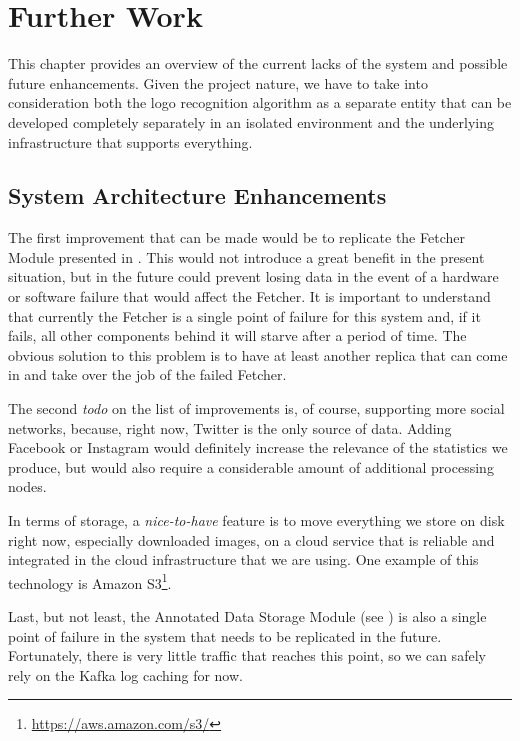 \chapter{Further Work}

This chapter provides an overview of the current lacks of the system and
possible future enhancements. Given the project nature, we have to take into
consideration both the logo recognition algorithm as a separate entity that
can be developed completely separately in an isolated environment and the
underlying infrastructure that supports everything.

\section{System Architecture Enhancements}

The first improvement that can be made would be to replicate the Fetcher
Module presented in . This would
not introduce a great benefit in the present situation, but in the future
could prevent losing data in the event of a hardware or software failure that
would affect the Fetcher. It is important to understand that currently the
Fetcher is a single point of failure for this system and, if it fails, all
other components behind it will starve after a period of time. The obvious
solution to this problem is to have at least another replica that can come in and
take over the job of the failed Fetcher.

The second \textit{todo} on the list of improvements is, of course, supporting
more social networks, because, right now, Twitter is the only source of data.
Adding Facebook or Instagram would definitely increase the relevance of the
statistics we produce, but would also require a considerable amount of
additional processing nodes.

In terms of storage, a \textit{nice-to-have} feature is to move everything we
store on disk right now, especially downloaded images, on a cloud service that
is reliable and integrated in the cloud infrastructure that we are using. One
example of this technology is Amazon
S3\footnote{\url{https://aws.amazon.com/s3/}}.

Last, but not least, the Annotated Data Storage Module (see
) is also a single point of failure
in the system that needs to be replicated in the future. Fortunately, there is
very little traffic that reaches this point, so we can safely rely on the
Kafka log caching for now.

